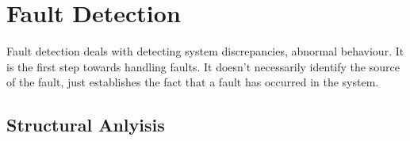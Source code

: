 \chapter{Fault Detection}

Fault detection deals with detecting system discrepancies, abnormal behaviour. It is the first step towards handling faults. It doesn't necessarily identify the source of the fault, just establishes the fact that a fault has occurred in the system.

\section{Structural Anlyisis}

